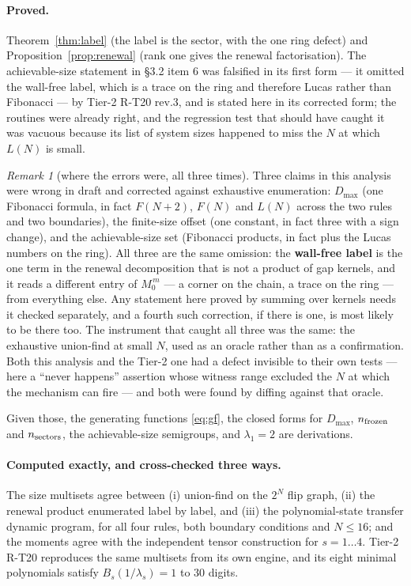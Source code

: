 \documentclass[11pt]{article}
\theoremstyle{plain}
\theoremstyle{remark}
\newtheorem{remark}{Remark}
\begin{document}
\paragraph{Proved.} Theorem~\ref{thm:label} (the label is the sector, with the
one ring defect) and Proposition~\ref{prop:renewal} (rank one gives the renewal
factorisation). The achievable-size statement in \S3.2 item 6 was falsified in
its first form --- it omitted the wall-free label, which is a trace on the ring
and therefore Lucas rather than Fibonacci --- by Tier-2 R-T20 rev.3, and is
stated here in its corrected form; the routines were already right, and the
regression test that should have caught it was vacuous because its list of
system sizes happened to miss the $N$ at which $L(N)$ is small.

\begin{remark}[where the errors were, all three times]
\label{rem:wallfree}
Three claims in this analysis were wrong in draft and corrected against
exhaustive enumeration: $D_{\max}$ (one Fibonacci formula, in fact $F(N+2)$,
$F(N)$ and $L(N)$ across the two rules and two boundaries), the finite-size
offset (one constant, in fact three with a sign change), and the achievable-size
set (Fibonacci products, in fact plus the Lucas numbers on the ring). All three
are the same omission: the \textbf{wall-free label} is the one term in the
renewal decomposition that is not a product of gap kernels, and it reads a
different entry of $M_0^{\,m}$ --- a corner on the chain, a trace on the ring ---
from everything else. Any statement here proved by summing over kernels needs it
checked separately, and a fourth such correction, if there is one, is most likely
to be there too. The instrument that caught all three was the same: the exhaustive
union-find at small $N$, used as an oracle rather than as a confirmation. Both
this analysis and the Tier-2 one had a defect invisible to their own tests ---
here a ``never happens'' assertion whose witness range excluded the $N$ at which
the mechanism can fire --- and both were found by diffing against that oracle.
\end{remark} Given those, the generating functions \eqref{eq:gf}, the closed
forms for $D_{\max}$, $n_{\rm frozen}$ and $n_{\rm sectors}$, the achievable-size
semigroups, and $\lambda_1=2$ are derivations.

\paragraph{Computed exactly, and cross-checked three ways.} The size multisets
agree between (i) union-find on the $2^N$ flip graph, (ii) the renewal product
enumerated label by label, and (iii) the polynomial-state transfer dynamic
program, for all four rules, both boundary conditions and $N\le16$; and the
moments agree with the independent tensor construction for $s=1\ldots4$.
Tier-2 R-T20 reproduces the same multisets from its own engine, and its eight
minimal polynomials satisfy $B_s(1/\lambda_s)=1$ to $30$ digits.
\end{document}
